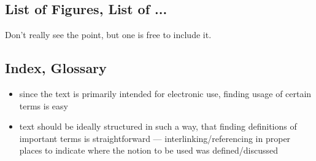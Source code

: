 \subsection{List of Figures, List of ...}%
\label{sub:List of Figures List of ...}

Don't really see the point, but one is free to include it.

\subsection{Index, Glossary}%
\label{sub:Index Glossary}

\begin{itemize}
    \item since the text is primarily intended for electronic use, finding usage of certain terms is easy
    \item text should be ideally structured in such a way, that finding definitions of important terms is straightforward --- interlinking/referencing in proper places to indicate where the notion to be used was defined/discussed
\end{itemize}
